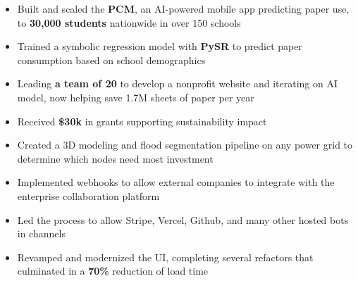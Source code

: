 \documentclass[9pt,a4paper,ragged2e]{altacv}
\begin{document}
\tagline{}

\begin{fullwidth}
  \makecvheader
\end{fullwidth}




\begin{itemize} \itemsep 0pt  %
    \item Built and scaled the \textbf{PCM}, an AI-powered mobile app predicting paper use, to \textbf{30,000 students} nationwide in over {150 schools}
    \item Trained a symbolic regression model with \textbf{PySR} to predict paper consumption based on school demographics
  \item Leading \textbf{a team of 20} to develop a nonprofit website and iterating on AI model, now helping save 1.7M sheets of paper per year
  \item Received \textbf{\$30k} in grants supporting sustainability impact
\end{itemize}

\divider

\begin{itemize} \itemsep 0pt  %
    \item Created a 3D modeling and flood segmentation pipeline on any power grid to determine which nodes need most investment
\end{itemize}

\divider

\begin{itemize} \itemsep 0pt  %
    \item Implemented webhooks to allow external companies to integrate with the enterprise collaboration platform
    \item Led the process to allow Stripe, Vercel, Github, and many other hosted bots in channels
    \item Revamped and modernized the UI, completing several refactors that culminated in a \textbf{70\%} reduction of load time
\end{itemize}
\end{document}
